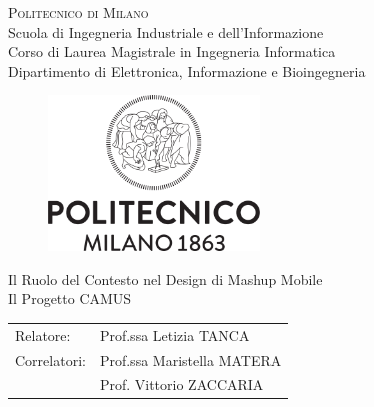 \begin{titlepage}

\begin{center}
\Large{\textsc{Politecnico di Milano}}\\
\Large{Scuola di Ingegneria Industriale e dell'Informazione}\\
\large{Corso di Laurea Magistrale in Ingegneria Informatica}\\
\large{Dipartimento di Elettronica, Informazione e Bioingegneria}
\par\end{center}

\vspace{0.5cm}


\begin{center}
\begin{figure}[h]
\centering{}\includegraphics[width=0.5\textwidth]{frontespizio/logo-polimi.png}
\end{figure}
\vspace{1cm}

\par\end{center}

\begin{center}
\LARGE{Il Ruolo del Contesto nel Design di Mashup Mobile\\
	Il Progetto CAMUS}\vspace{2cm}

\par\end{center}

\begin{flushleft}
\begin{tabular}{ll}
Relatore:  & Prof.ssa Letizia TANCA\tabularnewline
Correlatori:  & Prof.ssa Maristella MATERA\tabularnewline
	& Prof. Vittorio ZACCARIA
\end{tabular}\vspace{1cm}

\par\end{flushleft}


\end{titlepage}
